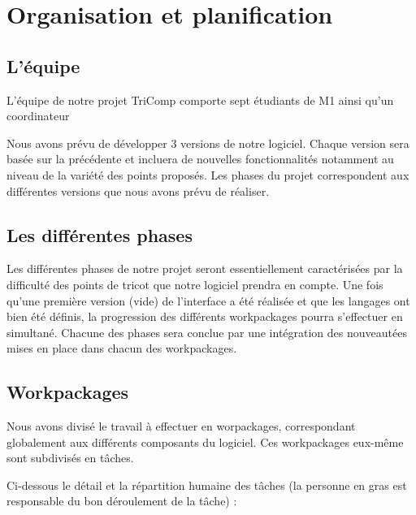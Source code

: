\documentclass{article}
\begin{document}
\section{Organisation et planification}

\subsection{L'équipe}

L'équipe de notre projet TriComp comporte sept étudiants de M1 ainsi qu'un coordinateur

Nous avons prévu de développer 3 versions de notre logiciel. Chaque version sera basée sur la précédente et incluera de nouvelles fonctionnalités notamment au niveau de la variété des points proposés.
Les phases du projet correspondent aux différentes versions que nous avons prévu de réaliser.



\subsection{Les différentes phases}

Les différentes phases de notre projet seront essentiellement caractérisées par la difficulté des points de tricot que notre logiciel 
prendra en compte. 
Une fois qu'une première version (vide) de l'interface a été réalisée et que les langages ont bien été définis, la progression des
différents workpackages pourra s'effectuer en simultané. Chacune des phases sera conclue par une intégration des nouveautées mises en 
place dans chacun des workpackages.


\subsection{Workpackages}

Nous avons divisé le travail à effectuer en worpackages, correspondant globalement aux différents composants du logiciel. Ces workpackages eux-même sont subdivisés en tâches.

Ci-dessous le détail et la répartition humaine des tâches (la personne en gras est responsable du bon déroulement de la tâche) :
\end{document}
